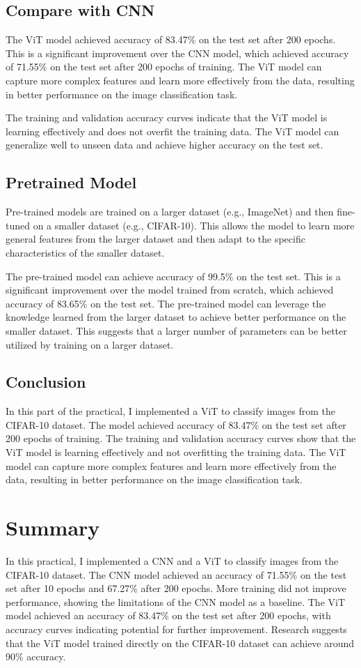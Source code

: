 \documentclass[12pt]{article}
\begin{document}
\subsection{Compare with CNN}
The ViT model achieved accuracy of 83.47\% on the test set after 200 epochs. 
This is a significant improvement over the CNN model, which achieved accuracy of 71.55\% on the test set after 200 epochs of training. 
The ViT model can capture more complex features and learn more effectively from the data, resulting in better performance on the image classification task.

The training and validation accuracy curves indicate that the ViT model is learning effectively and does not overfit the training data.
The ViT model can generalize well to unseen data and achieve higher accuracy on the test set.
\subsection{Pretrained Model}
Pre-trained models are trained on a larger dataset (e.g., ImageNet) and then fine-tuned on a smaller dataset (e.g., CIFAR-10). 
This allows the model to learn more general features from the larger dataset and then adapt to the specific characteristics of the smaller dataset.

The pre-trained model can achieve accuracy of 99.5\% on the test set. 
This is a significant improvement over the model trained from scratch, which achieved accuracy of 83.65\% on the test set. 
The pre-trained model can leverage the knowledge learned from the larger dataset to achieve better performance on the smaller dataset. 
This suggests that a larger number of parameters can be better utilized by training on a larger dataset.
\subsection{Conclusion}
In this part of the practical, I implemented a ViT to classify images from the CIFAR-10 dataset. 
The model achieved accuracy of 83.47\% on the test set after 200 epochs of training. 
The training and validation accuracy curves show that the ViT model is learning effectively and not overfitting the training data. 
The ViT model can capture more complex features and learn more effectively from the data, resulting in better performance on the image classification task.
\section{Summary}
In this practical, I implemented a CNN and a ViT to classify images from the CIFAR-10 dataset. 
The CNN model achieved an accuracy of 71.55\% on the test set after 10 epochs and 67.27\% after 200 epochs. 
More training did not improve performance, showing the limitations of the CNN model as a baseline. 
The ViT model achieved an accuracy of 83.47\% on the test set after 200 epochs, with accuracy curves indicating potential for further improvement. 
Research suggests that the ViT model trained directly on the CIFAR-10 dataset can achieve around 90\% accuracy.
\end{document}
